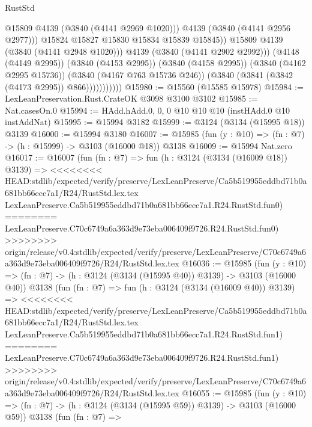 \begin{lexlean}{RustStd}
\begin{coremodule}
{\begin{coremodule}
{{{{{{{{{{{{{{{{{{{{{{{{{{                                  @15809
                                  @4139
                                  (@3840 (@4141 @2969 @1020)))
                                @4139
                                (@3840 (@4141 @2956 @2977)))
                              @15824
                              @15827
                              @15830
                              @15834
                              @15839
                              @15845))
                          @15809
                          @4139
                          (@3840 (@4141 @2948 @1020)))
                        @4139
                        (@3840 (@4141 @2902 @2992)))
                      (@4148 (@4149 @2995))
                      (@3840 (@4153 @2995))
                      (@3840 (@4158 @2995))
                      (@3840 (@4162 @2995 @15736))
                      (@3840 (@4167 @763 @15736 @246))
                      (@3840 (@3841 (@3842 (@4173 @2995)) @866)))))))))))
@15980 := @15560 (@15585 @15978)
@15984 := LexLeanPreservation.Rust.CrateOK @3098 @3100 @3102
@15985 := Nat.casesOn.{0}
@15994 := HAdd.hAdd.{0, 0, 0} @10 @10 @10 (instHAdd.{0} @10 instAddNat)
@15995 := @15994 @3182
@15999 := @3124 (@3134 (@15995 @18)) @3139
@16000 := @15994 @3180
@16007 := @15985 (fun (y : @10) => (fn : @7) -> (h : @15999) -> @3103 (@16000 @18)) @3138
@16009 := @15994 Nat.zero
@16017 := @16007
    (fun (fn : @7) =>
    fun (h : @3124 (@3134 (@16009 @18)) @3139) =>
<<<<<<<< HEAD:stdlib/expected/verify/preserve/LexLeanPreserve/Ca5b519955eddbd71b0a681bb66ecc7a1/R24/RustStd.lex.tex
    LexLeanPreserve.Ca5b519955eddbd71b0a681bb66ecc7a1.R24.RustStd.fun0)
========
    LexLeanPreserve.C70c6749a6a363d9e73eba006409f9726.R24.RustStd.fun0)
>>>>>>>> origin/release/v0.4:stdlib/expected/verify/preserve/LexLeanPreserve/C70c6749a6a363d9e73eba006409f9726/R24/RustStd.lex.tex
@16036 := @15985
    (fun (y : @10) => (fn : @7) -> (h : @3124 (@3134 (@15995 @40)) @3139) -> @3103 (@16000 @40))
    @3138
    (fun (fn : @7) =>
    fun (h : @3124 (@3134 (@16009 @40)) @3139) =>
<<<<<<<< HEAD:stdlib/expected/verify/preserve/LexLeanPreserve/Ca5b519955eddbd71b0a681bb66ecc7a1/R24/RustStd.lex.tex
    LexLeanPreserve.Ca5b519955eddbd71b0a681bb66ecc7a1.R24.RustStd.fun1)
========
    LexLeanPreserve.C70c6749a6a363d9e73eba006409f9726.R24.RustStd.fun1)
>>>>>>>> origin/release/v0.4:stdlib/expected/verify/preserve/LexLeanPreserve/C70c6749a6a363d9e73eba006409f9726/R24/RustStd.lex.tex
@16055 := @15985
    (fun (y : @10) => (fn : @7) -> (h : @3124 (@3134 (@15995 @59)) @3139) -> @3103 (@16000 @59))
    @3138
    (fun (fn : @7) =>
}}}}}}}}}}}}}}}}}}}}}}}}}}
\end{coremodule}}
\end{coremodule}
\end{lexlean}
